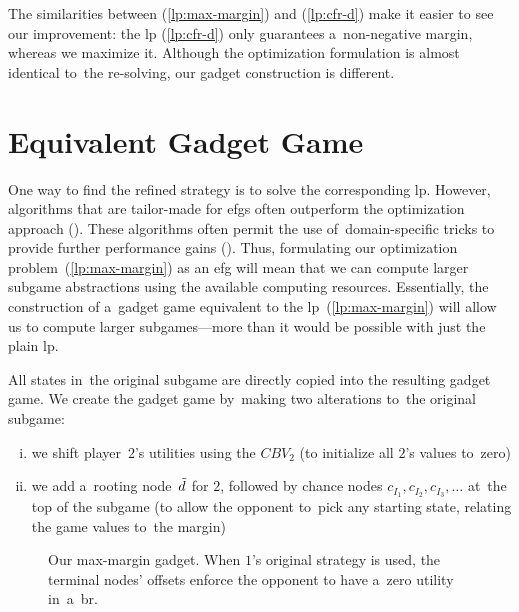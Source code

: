 The similarities between (\ref{lp:max-margin}) and (\ref{lp:cfr-d}) make it easier to see our improvement:
the \acrshort{lp} (\ref{lp:cfr-d}) only guarantees a~non-negative margin, whereas we maximize it.
Although the optimization formulation is almost identical to~the re-solving, our gadget construction is different.

\section{Equivalent Gadget Game}
One way to find the refined strategy is to solve the corresponding \acrfull{lp}.
However, algorithms that are tailor-made for \acrshort{efg}s often outperform the optimization approach (\cite{Bosansky2013solving}).
These algorithms often permit the use of~domain-specific tricks to provide further performance gains (\cite{Johanson2012efficient}).
Thus, formulating our optimization problem~(\ref{lp:max-margin}) as an \acrshort{efg} will mean that we can compute larger subgame abstractions using the available computing resources.
Essentially, the construction of a~gadget game equivalent to the \acrshort{lp}~(\ref{lp:max-margin}) will allow us to compute larger subgames---more than it would be possible with just the plain \acrshort{lp}.

All states in~the original subgame are directly copied into the resulting gadget game.
We create the gadget game by~making two alterations to~the original subgame:
\begin{enumerate}[(i)]
  \item we shift player~$2$'s utilities using the $CBV_2$ (to initialize all $2$'s values to~zero)
  \item we add a~rooting node~$\tilde{d}$ for $2$, followed by chance nodes $c_{I_1}, c_{I_2}, c_{I_3}, \dots$ at~the top of the subgame (to allow the opponent to~pick any starting state, relating the game values to~the margin)
\end{enumerate}

\begin{figure}[H]
  \centering
  \def\svgwidth{.4\textwidth}
  
  \def\captionTitle{Our max-margin gadget}
  \caption[\captionTitle]{\captionTitle. When $1$'s original strategy is used, the terminal nodes' offsets enforce the opponent to have a~zero utility in~a~\acrshort{br}.}
  \label{fig:max-margin-gadget}
\end{figure}

